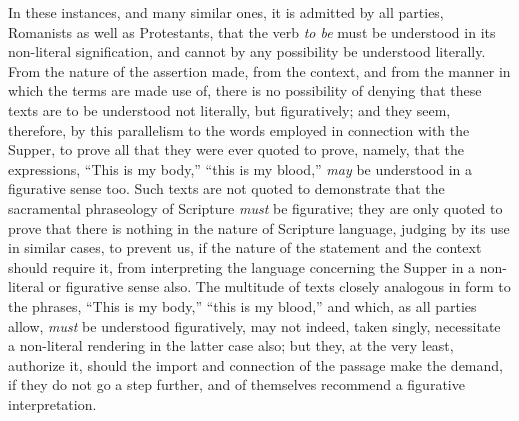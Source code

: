 \documentclass[english,]{book}
\begin{document}
In these instances, and many similar ones, it is admitted by all parties, Romanists as well as Protestants, that the verb \emph{to be} must be understood in its non-literal signification, and cannot by any possibility be understood literally. From the nature of the assertion made, from the context, and from the manner in which the terms are made use of, there is no possibility of denying that these texts are to be understood not literally, but figuratively; and they seem, therefore, by this parallelism to the words employed in connection with the Supper, to prove all that they were ever quoted to prove, namely, that the expressions, ``This is my body,'' ``this is my blood,'' \emph{may} be understood in a figurative sense too. Such texts are not quoted to demonstrate that the sacramental phraseology of Scripture \emph{must} be figurative; they are only quoted to prove that there is nothing in the nature of Scripture language, judging by its use in similar cases, to prevent us, if the nature of the statement and the context should require it, from interpreting the language concerning the Supper in a non-literal or figurative sense also. The multitude of texts closely analogous in form to the phrases, ``This is my body,'' ``this is my blood,'' and which, as all parties allow, \emph{must} be understood figuratively, may not indeed, taken singly, necessitate a non-literal rendering in the latter case also; but they, at the very least, authorize it, should the import and connection of the passage make the demand, if they do not go a step further, and of themselves recommend a figurative interpretation.
\end{document}
